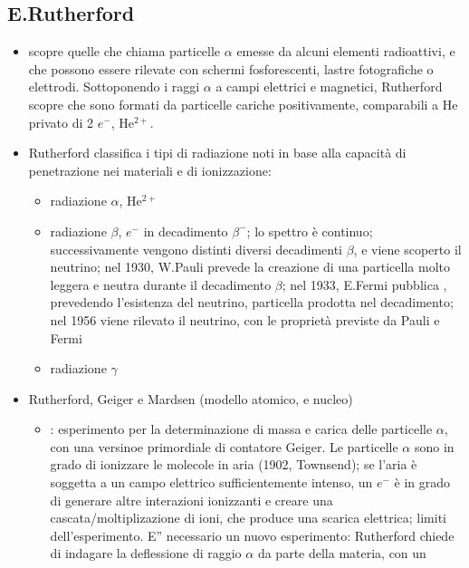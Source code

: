 \documentclass[letterpaper,10pt,italian]{jupyterBook}
\begin{document}
\subsection{E.Rutherford}
\label{\detokenize{ch/modern/intro-radioactivity:e-rutherford}}\begin{itemize}
\item {} 
 scopre quelle che chiama particelle \(\alpha\) emesse da alcuni elementi radioattivi, e che possono essere rilevate con schermi fosforescenti, lastre fotografiche o elettrodi. Sottoponendo i raggi \(\alpha\) a campi elettrici e magnetici, Rutherford scopre che sono formati da particelle cariche positivamente, comparabili a He privato di 2 \(e^-\), He\(^{2+}\).

\item {} 
\sphinxAtStartPar
Rutherford classifica i tipi di radiazione noti in base alla capacità di penetrazione nei materiali e di ionizzazione:
\begin{itemize}
\item {} 
\sphinxAtStartPar
radiazione \(\alpha\), He\(^{2+}\)

\item {} 
\sphinxAtStartPar
radiazione \(\beta\), \(e^{-}\) in decadimento \(\beta^-\); lo spettro è continuo; successivamente vengono distinti diversi decadimenti \(\beta\), e viene scoperto il neutrino; nel 1930, W.Pauli prevede la creazione di una particella molto leggera e neutra durante il decadimento \(\beta\); nel 1933, E.Fermi pubblica , prevedendo l’esistenza del neutrino, particella prodotta nel decadimento; nel 1956 viene rilevato il neutrino, con le proprietà previste da Pauli e Fermi

\item {} 
\sphinxAtStartPar
radiazione \(\gamma\)

\end{itemize}

\item {} 
\sphinxAtStartPar
Rutherford, Geiger e Mardsen (modello atomico, e nucleo)
\begin{itemize}
\item {} 
: esperimento per la determinazione di massa e carica delle particelle \(\alpha\), con una versinoe primordiale di contatore Geiger. Le particelle \(\alpha\) sono in grado di ionizzare le molecole in aria (1902, Townsend); se l’aria è soggetta a un campo elettrico sufficientemente intenso, un \(e^-\) è in grado di generare altre interazioni ionizzanti e creare una cascata/moltiplizazione di ioni, che produce una scarica elettrica;  limiti dell’esperimento. E” necessario un nuovo esperimento: Rutherford chiede di indagare la deflessione di raggio \(\alpha\) da parte della materia, con un 


\end{itemize}
\end{itemize}
\end{document}
